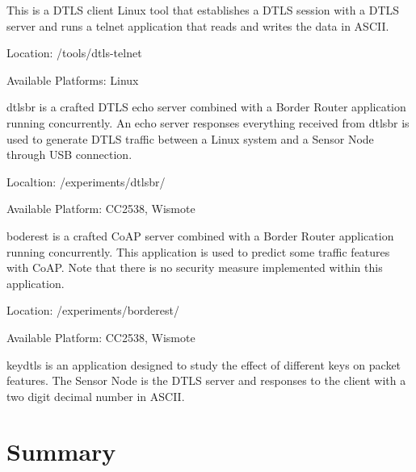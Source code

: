 \begin{description}[style=nextline]

\item[dtls-telnet]
This is a DTLS client Linux tool that establishes a DTLS session with a DTLS server and runs a telnet application that reads and writes the data in ASCII. 

Location: /tools/dtls-telnet

Available Platforms: Linux

\item[dtlsbr]
dtlsbr is a crafted DTLS echo server combined with a Border Router application running concurrently. An echo server responses everything received from  dtlsbr is used to generate DTLS traffic between a Linux system and a Sensor Node through USB connection.

Localtion: /experiments/dtlsbr/

Available Platform: CC2538, Wismote

\item[borderest]
boderest is a crafted CoAP server combined with a Border Router application running concurrently. This application is used to predict some traffic features with CoAP. Note that there is no security measure implemented within this application.

Location: /experiments/borderest/

Available Platform: CC2538, Wismote

\item[keydtls]
keydtls is an application designed to study the effect of different keys on packet features. The Sensor Node is the DTLS server and responses to the client with a two digit decimal number in ASCII. 





\end{description}

\section{Summary}


